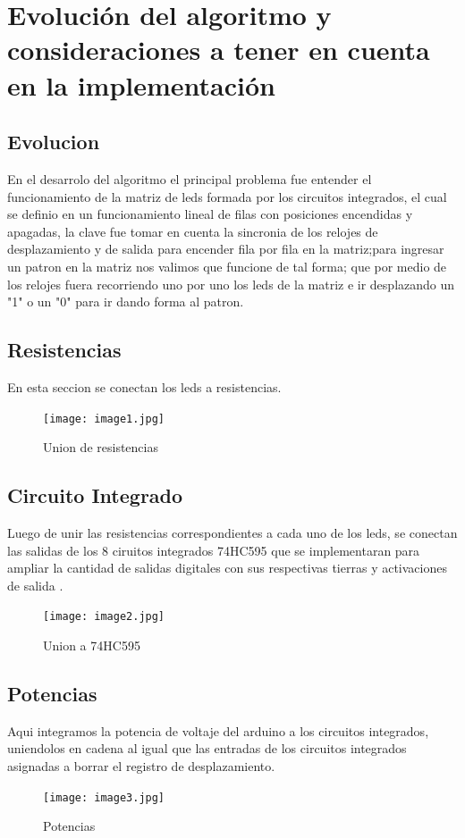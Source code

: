 \documentclass{article}
\begin{document}
\section{Evolución del algoritmo y consideraciones a tener en cuenta en la implementación} 
\label{contenido}
\subsection{Evolucion}
En el desarrolo del algoritmo el principal problema fue entender el funcionamiento de la matriz de leds formada por los circuitos integrados, el cual se definio en un funcionamiento lineal de filas con posiciones encendidas y apagadas, la clave fue tomar en cuenta la sincronia de los relojes de desplazamiento y de salida para encender fila por fila en la matriz;para ingresar un patron en la matriz nos valimos que funcione de tal forma; que por medio de los relojes fuera recorriendo uno por uno los leds de la matriz e ir desplazando un "1" o un "0" para ir dando forma al patron.

\subsection{Resistencias}
En esta seccion se conectan los leds a resistencias.
    \begin{figure}[h]
    \centering
    \texttt{[image: image1.jpg]}
    \caption{Union de resistencias}
    \label{fig:image1}
    \end{figure}

\subsection{Circuito Integrado}
Luego de unir las resistencias correspondientes a cada uno de los leds, se conectan las salidas de los 8 ciruitos integrados 74HC595 que se implementaran para ampliar la cantidad de salidas digitales con sus respectivas tierras y activaciones de salida .
    \begin{figure}[h]
    \texttt{[image: image2.jpg]}
    \centering
    \caption{Union a 74HC595}
    \label{fig:image2}
    \end{figure}

\subsection{Potencias}
Aqui integramos la potencia de voltaje del arduino a los circuitos integrados, uniendolos en cadena al igual que las entradas de los circuitos integrados asignadas a borrar el registro de desplazamiento.
    \begin{figure}[h]
    \texttt{[image: image3.jpg]}
    \centering
    \caption{Potencias}
    \label{fig:image3}
    \end{figure}
\end{document}
